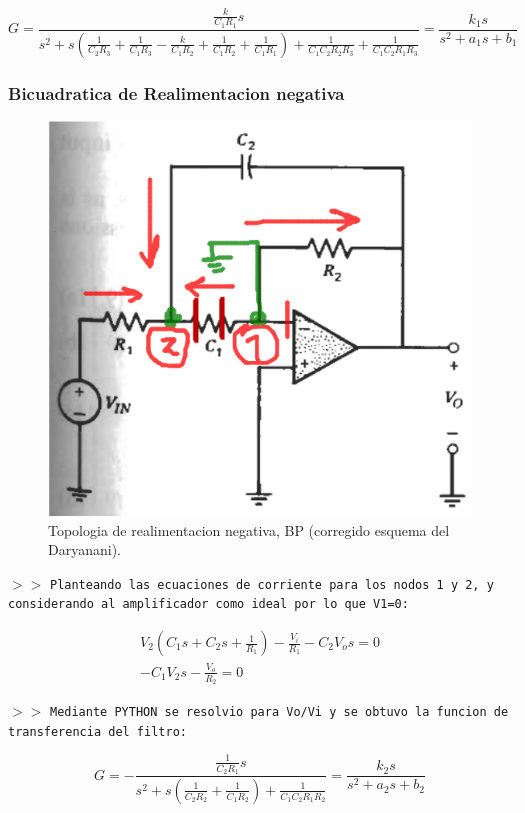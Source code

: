 \begin{equation}\label{posFT}
    G = \frac{\frac{k}{C_{1} R_{1} }s}{s^{2} + s \left(\frac{1}{C_{2} R_{3}} + \frac{1}{C_{1} R_{3}} - \frac{k}{C_{1} R_{2}} + \frac{1}{C_{1} R_{2}} + \frac{1}{C_{1} R_{1}}\right) + \frac{1}{C_{1} C_{2} R_{2} R_{3}} + \frac{1}{C_{1} C_{2} R_{1} R_{3}}}
    = \frac{k_1 s}{s^{2} + a_1 s + b_1}
\end{equation}

\subsubsection{Bicuadratica de Realimentacion negativa}

\begin{figure}[H]
    \centering
    \includegraphics[scale=.5]{Secciones/Circ1/img/negBiquadBP.png}
    \caption{Topologia de realimentacion negativa, BP (corregido esquema del Daryanani).}
    \label{pv1}
\end{figure}

\noindent $>>$ \texttt{Planteando las ecuaciones de corriente para los nodos 1 y 2, y considerando al amplificador como ideal por lo que V1=0:}

\begin{align*}
    V_2 \left(C_{1} s + C_{2} s + \frac{1}{R_{1}}\right) - \frac{V_i}{R_{1}} - C_{2} V_o s = 0 \\
    - C_{1} V_2 s - \frac{V_o}{R_{2}} = 0
\end{align*}

\noindent $>>$ \texttt{Mediante PYTHON se resolvio para Vo/Vi y se obtuvo la funcion de transferencia del filtro:}

\begin{equation}\label{negFT}
    G = - \frac{\frac{1}{C_{2} R_{1}}s}{s^{2} + s \left(\frac{1}{C_{2} R_{2}} + \frac{1}{C_{1} R_{2}}\right) + \frac{1}{C_{1} C_{2} R_{1} R_{2}}}
    = \frac{k_2 s}{s^{2} + a_2 s  + b_2}
\end{equation}
